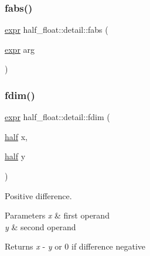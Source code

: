 \subsubsection{\texorpdfstring{fabs()}{fabs()}\hspace{0.1cm}{\footnotesize\ttfamily [2/2]}}
{\footnotesize\ttfamily \hyperlink{structhalf__float_1_1detail_1_1expr}{expr} half\+\_\+float\+::detail\+::fabs (\begin{DoxyParamCaption}\item[{\hyperlink{structhalf__float_1_1detail_1_1expr}{expr}}]{arg }\end{DoxyParamCaption})\hspace{0.3cm}{\ttfamily [inline]}}

\mbox{\label{namespacehalf__float_1_1detail_a09a51a6e291a38991305ecdc8721ed85}} 
\subsubsection{\texorpdfstring{fdim()}{fdim()}\hspace{0.1cm}{\footnotesize\ttfamily [1/4]}}
{\footnotesize\ttfamily \hyperlink{structhalf__float_1_1detail_1_1expr}{expr} half\+\_\+float\+::detail\+::fdim (\begin{DoxyParamCaption}\item[{\hyperlink{classhalf__float_1_1half}{half}}]{x,  }\item[{\hyperlink{classhalf__float_1_1half}{half}}]{y }\end{DoxyParamCaption})\hspace{0.3cm}{\ttfamily [inline]}}

Positive difference. 
\begin{DoxyParams}{Parameters}
{\em x} & first operand \\
\hline
{\em y} & second operand \\
\hline
\end{DoxyParams}
\begin{DoxyReturn}{Returns}
{\itshape x} -\/ {\itshape y} or 0 if difference negative 
\end{DoxyReturn}
\mbox{\label{namespacehalf__float_1_1detail_abc68948d8a694a01e4f07994dec98a42}} 
